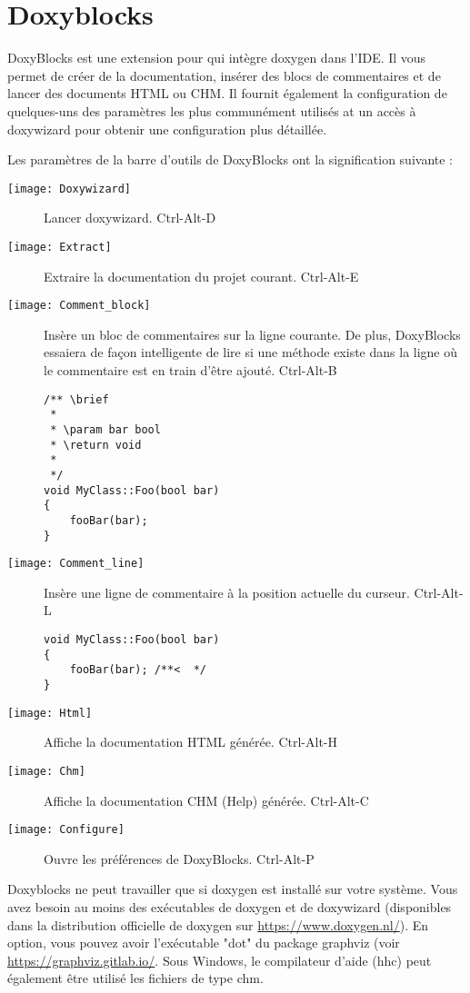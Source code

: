 ﻿\section{Doxyblocks}\label{sec:doxyblocks}

DoxyBlocks est une extension pour \codeblocks qui intègre doxygen dans l'IDE. Il vous permet de créer de la documentation, insérer des blocs de commentaires et de lancer des documents HTML ou CHM. Il fournit également la configuration de quelques-uns des paramètres les plus communément utilisés at un accès à doxywizard pour obtenir une configuration plus détaillée.

Les paramètres de la barre d'outils de DoxyBlocks ont la signification suivante :

\begin{description}
\item[\texttt{[image: Doxywizard]}] Lancer doxywizard. Ctrl-Alt-D
\item[\texttt{[image: Extract]}] Extraire la documentation du projet courant. Ctrl-Alt-E
\item[\texttt{[image: Comment\_block]}] Insère un bloc de commentaires sur la ligne courante. De plus, DoxyBlocks essaiera de façon intelligente de lire si une méthode existe dans la ligne où le commentaire est en train d'être ajouté. Ctrl-Alt-B

\begin{lstlisting}
/** \brief
 *
 * \param bar bool
 * \return void
 *
 */    
void MyClass::Foo(bool bar)
{
    fooBar(bar);
}
\end{lstlisting}

\item[\texttt{[image: Comment\_line]}] Insère une ligne de commentaire à la position actuelle du curseur. Ctrl-Alt-L
\begin{lstlisting}
void MyClass::Foo(bool bar)
{
    fooBar(bar); /**<  */
}
\end{lstlisting}

\item[\texttt{[image: Html]}] Affiche la documentation HTML générée. Ctrl-Alt-H
\item[\texttt{[image: Chm]}] Affiche la documentation CHM (Help) générée. Ctrl-Alt-C
\item[\texttt{[image: Configure]}] Ouvre les préférences de DoxyBlocks. Ctrl-Alt-P
\end{description}

Doxyblocks ne peut travailler que si doxygen est installé sur votre système. Vous avez besoin au moins des exécutables de doxygen et de doxywizard (disponibles dans la distribution officielle de doxygen sur \url{https://www.doxygen.nl/}). En option, vous pouvez avoir l'exécutable "dot" du package graphviz (voir \url{https://graphviz.gitlab.io/}. Sous Windows, le compilateur d'aide (hhc) peut également être utilisé les fichiers de type chm.

